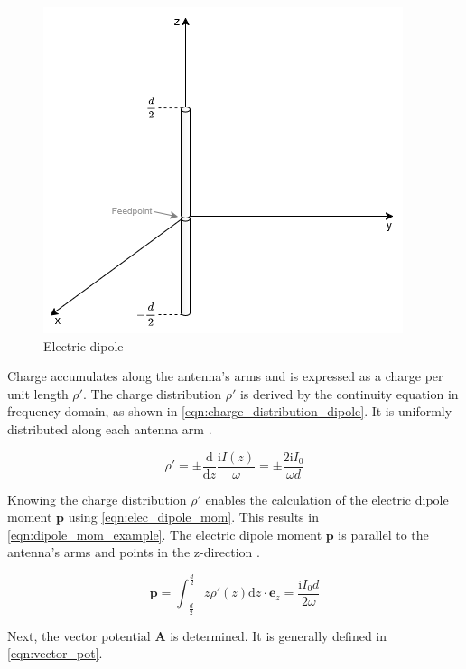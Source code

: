 
\begin{figure}[h]
    \centering
    \includegraphics[width=0.5\linewidth]{images/electric_dipole_drawing.png}
    \caption{Electric dipole}
    \label{fig:electric_dipole}
\end{figure}

Charge accumulates along the antenna's arms and is expressed as a charge per unit length $\rho'$. The charge distribution $\rho'$ is derived by the continuity equation in frequency domain, as shown in \autoref{eqn:charge_distribution_dipole}. It is uniformly distributed along each antenna arm \cite{Griffiths_2024,Jackson}.

\begin{equation}
    \rho' = \pm\frac{\mathrm{d}}{\mathrm{d}z}\frac{\mathrm{i}I(z)}{\omega} = \pm\frac{2\mathrm{i}I_0}{\omega d}
    \label{eqn:charge_distribution_dipole}
\end{equation}

Knowing the charge distribution $\rho'$ enables the calculation of the electric dipole moment $\mathbf{p}$ using \autoref{eqn:elec_dipole_mom}. This results in \autoref{eqn:dipole_mom_example}. The electric dipole moment $\mathbf{p}$ is parallel to the antenna's arms and points in the z-direction \cite{Griffiths_2024}\cite{Jackson}. 

\begin{equation}
    \mathbf{p}=\int_{-\frac{d}{2}}^{\frac{d}{2}}z\rho'(z)\mathrm{d}z\cdot\mathbf{e}_z = \frac{\mathrm{i}I_0d}{2\omega}
    \label{eqn:dipole_mom_example}
\end{equation}

Next, the vector potential $\mathbf{A}$ is determined. It is generally defined in \autoref{eqn:vector_pot}\cite{Balanis_1997}\cite{Jackson}. %

